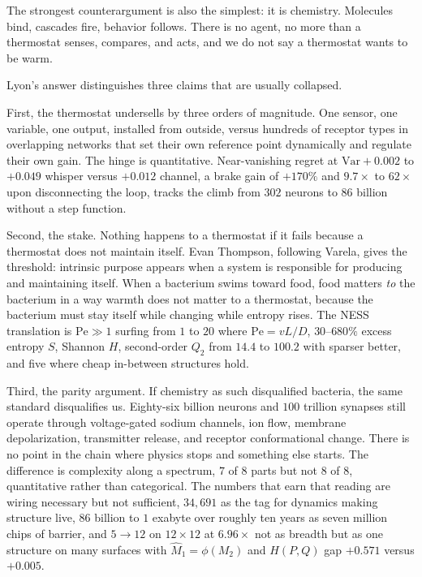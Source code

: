 \documentclass[12pt,a4paper]{article}
\newcommand{\Pe}{\mathrm{Pe}}
\begin{document}
The strongest counterargument is also the simplest: it is chemistry. Molecules bind, cascades fire, behavior follows. There is no agent, no more than a thermostat senses, compares, and acts, and we do not say a thermostat wants to be warm.

Lyon's answer distinguishes three claims that are usually collapsed.

First, the thermostat undersells by three orders of magnitude. One sensor, one variable, one output, installed from outside, versus hundreds of receptor types in overlapping networks that set their own reference point dynamically and regulate their own gain. The hinge is quantitative. Near-vanishing regret at $\mathrm{Var}+0.002$ to $+0.049$ whisper versus $+0.012$ channel, a brake gain of $+170\%$ and $9.7\times$ to $62\times$ upon disconnecting the loop, tracks the climb from $302$ neurons to $86$ billion without a step function.

Second, the stake. Nothing happens to a thermostat if it fails because a thermostat does not maintain itself. Evan Thompson, following Varela, gives the threshold: intrinsic purpose appears when a system is responsible for producing and maintaining itself. When a bacterium swims toward food, food matters \emph{to} the bacterium in a way warmth does not matter to a thermostat, because the bacterium must stay itself while changing while entropy rises. The NESS translation is $\Pe \gg 1$ surfing from $1$ to $20$ where $\Pe = vL/D$, $30$--$680\%$ excess entropy $S$, Shannon $H$, second-order $Q_2$ from $14.4$ to $100.2$ with sparser better, and five where cheap in-between structures hold.

Third, the parity argument. If chemistry as such disqualified bacteria, the same standard disqualifies us. Eighty-six billion neurons and $100$ trillion synapses still operate through voltage-gated sodium channels, ion flow, membrane depolarization, transmitter release, and receptor conformational change. There is no point in the chain where physics stops and something else starts. The difference is complexity along a spectrum, $7$ of $8$ parts but not $8$ of $8$, quantitative rather than categorical. The numbers that earn that reading are wiring necessary but not sufficient, $34{,}691$ as the tag for dynamics making structure live, $86$ billion to $1$ exabyte over roughly ten years as seven million chips of barrier, and $5 \to 12$ on $12\times 12$ at $6.96\times$ not as breadth but as one structure on many surfaces with $\hat{M}_1 = \phi(M_2)$ and $H(P,Q)$ gap $+0.571$ versus $+0.005$.
\end{document}

